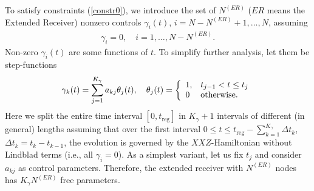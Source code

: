 \documentclass[pra,preprint,showpacs]{revtex4-1}
\begin{document}
To satisfy constraints (\ref{constr0}), we introduce  the set of  $N^{(ER)}$ ($ER$ means the Extended Receiver) nonzero controls
$\gamma_i(t)$, $i=N-N^{(ER)}+1, \dots, N$,
assuming
\begin{eqnarray}
\gamma_i=0,\quad  i=1,\dots,N-N^{(ER)}.
\end{eqnarray}
Non-zero $\gamma_i(t)$ are some functions of $t$. To simplify further analysis, let them be step-functions~\cite{PP_2023}
\begin{eqnarray}\label{LF}
\gamma_k(t) = \sum_{j=1}^{K_\gamma} a_{kj} \theta_j(t),\quad  \theta_j(t) =\left\{\begin{array}{ll}
1, &t_{j-1} < t\le t_j\cr
0  & {\mbox{otherwise}}. \end{array}
\right.
\end{eqnarray}
Here we split the entire time interval
$[0,t_{\mathrm{reg}}]$
in $K_\gamma+1$ intervals of different (in general) lengths assuming that over the first interval $0\le t\le t_{\mathrm{reg}}- \sum_{k=1}^{K_\gamma} \Delta t_k$, $\Delta t_k = t_k - t_{k-1}$, the evolution is governed by the $XXZ$-Hamiltonian without Lindblad terms (i.e., all  $\gamma_i=0$).
As a simplest variant, let us fix $t_j$ and consider  $a_{kj}$ as control parameters.
Therefore, the extended receiver with $N^{(ER)}$ nodes has $K_\gamma N^{(ER)}$ free parameters.
\iffalse
Then the evolution operator can be split into the set of non commuting (in general) operators $W_j$ of form
\begin{eqnarray}\label{VV}
W_j(t) &=& \left\{
\begin{array}{ll}
W_j(t) ,& t_{j-1} < t\le t_j\cr
1  & {\mbox{otherwise}}
\end{array}
\right..
\end{eqnarray}
\fi

\end{document}
